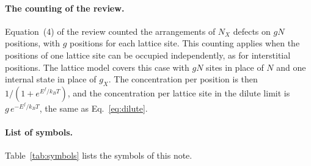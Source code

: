 \documentclass[11pt]{article}      %
\numberwithin{equation}{section}   %
\begin{document}
\paragraph{The counting of the review.}
Equation~(4) of the review counted the arrangements of $N_X$ defects on
$gN$ positions, with $g$ positions for each lattice site. This counting
applies when the positions of one lattice site can be occupied
independently, as for interstitial positions. The lattice model covers this
case with $gN$ sites in place of $N$ and one internal state in place of
$g_X$. The concentration per position is then $1/(1+e^{E^f/k_BT})$, and the
concentration per lattice site in the dilute limit is $g\,e^{-E^f/k_BT}$,
the same as Eq.~\eqref{eq:dilute}.

\paragraph{List of symbols.}
Table~\ref{tab:symbols} lists the symbols of this note.
\end{document}
